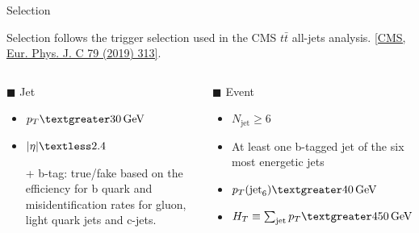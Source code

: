 \documentclass[10pt]{beamer}
\newcommand{\textGeV}[0]{\text{GeV}}
\newcommand{\textjet}[0]{\text{jet}}
\begin{document}
\begin{frame}[fragile]{Selection}

    Selection follows the trigger selection used in the CMS $t\bar{t}$ all-jets analysis. {\scriptsize \href{https://link.springer.com/article/10.1140\%2Fepjc\%2Fs10052-019-6788-2}{[CMS, Eur. Phys. J. C 79 (2019) 313]}}.

    \begin{columns}[T,onlytextwidth]
        \column{\textwidth}
        \begin{block}{$\blacksquare$ Jet}
            \begin{itemize}
                \item $ p_{T} \textgreater 30\,\textGeV $
                \item $ \abs{\eta} \textless 2.4 $
                \item[+]  b-tag: true/fake based on the efficiency for b quark and misidentification rates for gluon, light quark jets and c-jets.
            \end{itemize}
        \end{block}
        
        \begin{block}{$\blacksquare$ Event}
            \begin{itemize}
                \item $N_{\text{jet}} \ge 6$
                \item At least one b-tagged jet of the six most energetic jets
                \item $p_{T}(\text{jet}_{6}) \textgreater 40\,\textGeV$
                \item $H_{T} \equiv \sum_{\textjet} p_{T} \textgreater 450\,\textGeV$
            \end{itemize}
        \end{block}


    \end{columns}
\end{frame}
\end{document}

